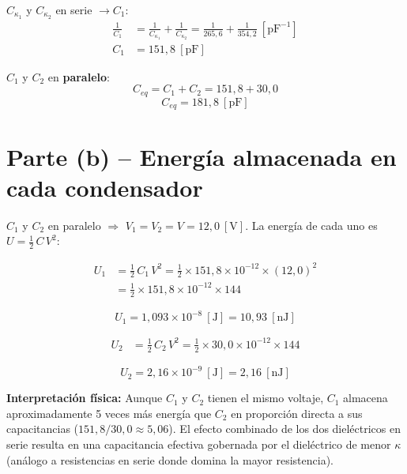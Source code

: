 \documentclass[12pt,letterpaper]{article}
\begin{document}
$C_{\kappa_1}$ y $C_{\kappa_2}$ en serie $\rightarrow C_1$:
\begin{align*}
    \frac{1}{C_1} &= \frac{1}{C_{\kappa_1}} + \frac{1}{C_{\kappa_2}}
                   = \frac{1}{265{,}6} + \frac{1}{354{,}2}\ [\text{pF}^{-1}]\\[6pt]
    C_1           &= 151{,}8\ [\text{pF}]
\end{align*}

$C_1$ y $C_2$ en \textbf{paralelo}:
\[
    C_{eq} = C_1 + C_2 = 151{,}8 + 30{,}0
\]
\[
    \boxed{C_{eq} = 181{,}8\ [\text{pF}]}
\]

\section*{Parte (b) -- Energ\'ia almacenada en cada condensador}

$C_1$ y $C_2$ en paralelo $\Rightarrow$ $V_1 = V_2 = V = 12{,}0\ [\text{V}]$.
La energ\'ia de cada uno es $U = \tfrac{1}{2}\,C\,V^2$:

\begin{align*}
    U_1 &= \frac{1}{2}\,C_1\,V^2
         = \frac{1}{2}\times151{,}8\times10^{-12}\times(12{,}0)^2\\[6pt]
        &= \frac{1}{2}\times151{,}8\times10^{-12}\times144
\end{align*}

\[
    \boxed{U_1 = 1{,}093\times10^{-8}\ [\text{J}] = 10{,}93\ [\text{nJ}]}
\]

\begin{align*}
    U_2 &= \frac{1}{2}\,C_2\,V^2
         = \frac{1}{2}\times30{,}0\times10^{-12}\times144
\end{align*}

\[
    \boxed{U_2 = 2{,}16\times10^{-9}\ [\text{J}] = 2{,}16\ [\text{nJ}]}
\]

\noindent\textbf{Interpretaci\'on f\'isica:} Aunque $C_1$ y $C_2$ tienen el mismo voltaje, $C_1$ almacena
aproximadamente 5 veces m\'as energ\'ia que $C_2$ en proporci\'on directa a sus capacitancias
($151{,}8/30{,}0 \approx 5{,}06$). El efecto combinado de los dos diel\'ectricos en serie
resulta en una capacitancia efectiva gobernada por el diel\'ectrico de menor $\kappa$
(an\'alogo a resistencias en serie donde domina la mayor resistencia).
\end{document}
